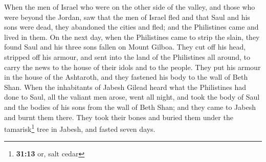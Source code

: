  When the men of Israel who were on the other side of the
valley, and those who were beyond the Jordan, saw that the men of Israel
fled and that Saul and his sons were dead, they abandoned the cities and
fled; and the Philistines came and lived in them.  On the
next day, when the Philistines came to strip the slain, they found Saul
and his three sons fallen on Mount Gilboa.  They cut off
his head, stripped off his armour, and sent into the land of the
Philistines all around, to carry the news to the house of their idols
and to the people.  They put his armour in the house of
the Ashtaroth, and they fastened his body to the wall of Beth Shan.
 When the inhabitants of Jabesh Gilead heard what the
Philistines had done to Saul,  all the valiant men arose,
went all night, and took the body of Saul and the bodies of his sons
from the wall of Beth Shan; and they came to Jabesh and burnt them
there.  They took their bones and buried them under the
tamarisk\footnote{\textbf{31:13} or, salt cedar} tree in Jabesh, and
fasted seven days.
